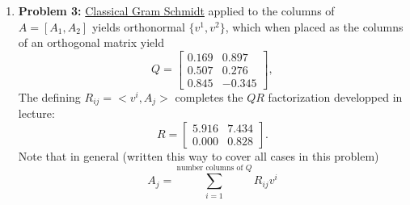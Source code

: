 \documentclass[letterpaper]{article}
\begin{document}
\begin{enumerate}
\underline{Proof} We decompose $A$ into its rows, that is  $A=\begin{bmatrix}a_1 \\ \vdots \\ a_m \end{bmatrix}$. Define $\tilde{A} = AQ^{-1}$ and define
$v_i \in \real^n $ by
$v_i = (a_i Q^{-1})^\top = Q^{-1} a_i^\top,$
where we have used the fact that $Q$ is symmetric. It follows that
$$Ax = b \iff <v_i, ~x> = b_i, ~~ i = 1,...,p$$
Hence,
$$\hat{x} = x^* = \sum \limits_{i=1}^{p} \beta_i v_i = [v_1 |~ ... ~|v_p] \beta$$ where $G \beta = b$ and $G$ is the Gram matrix.\\

\underline{Claim} $$G = AQ^{-1}A^\top~~~~~\text{and}~~~~~~[v_1 | ~... ~|v_p] = Q^{-1}A^\top$$  $\hfill \square$

Hence,
$$\hat{x} = Q^{-1}A^\top(AQ^{-1}A^\top)^{-1}b$$ $\hfill \square$

\underline{Proof of Claim:}
$$\begin{aligned} v_i &= Q^{-1} a_i^\top\\
[v_1 | ~... ~|v_p]  &= [Q^{-1}a_1^\top | ... | Q^{-1}a_p^\top]\\
&= Q^{-1}[a_1^\top | ... | a_p^\top]\\
&= Q^{-1} A^\top
\end{aligned}$$


$$\begin{aligned}
G_{ij} &= <v_i, ~v_j>\\
&= v_i^\top Q v_j\\
&= (a_i Q^{-1})QQ^{-1} a_j^\top\\
&= a_i Q^{-1} a_j^\top
\end{aligned}$$

$$\begin{aligned}(AQ^{-1}A^\top)_{ij} &= a_i (Q^{-1} A^\top)_{\text{j-column}}\\
&= a_i Q^{-1} a_j^\top \end{aligned}$$
$\hfill \square$

\item \noindent \textbf{Problem 3:}
\noindent \underline{Classical Gram Schmidt} applied to the columns of $A=[A_1, A_2]$ yields orthonormal $\{v^1, v^2 \}$, which when placed as the columns of an orthogonal matrix yield
$$Q=\left[ \begin{array}{rr}0.169& 0.897\\0.507& 0.276\\0.845& -0.345\end{array} \right],$$
The defining $R_{ij} = <v^i,A_j>$ completes the $QR$ factorization developped in lecture:
$$R=\left[ \begin{array}{rr}5.916& 7.434\\0.000& 0.828\end{array} \right].$$
Note that in general (written this way to cover all cases in this problem)
$$A_j = \sum_{i=1}^{\text{number columns of }Q } R_{ij} v^i$$


\end{enumerate}
\end{document}
